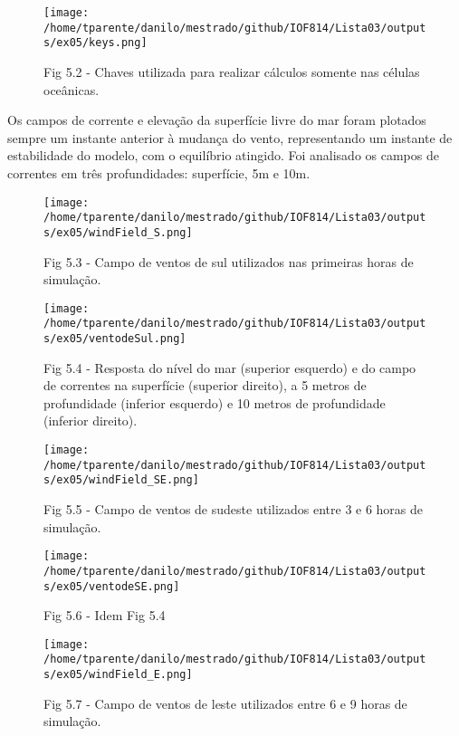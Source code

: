 \documentclass[11pt]{article}
\makeatletter
\def\maxwidth{\ifdim\Gin@nat@width>\linewidth\linewidth
    \else\Gin@nat@width\fi}
\let\Oldincludegraphics\includegraphics
\renewcommand{\includegraphics}[1]{\Oldincludegraphics[width=.8\maxwidth]{#1}}
\makeatother
\begin{document}
\begin{figure}[!ht]
\centering
\centerline{\hbox{\texttt{[image: /home/tparente/danilo/mestrado/github/IOF814/Lista03/outputs/ex05/keys.png]}}}
\caption{Fig 5.2 - Chaves utilizada para realizar cálculos somente nas células oceânicas.}
\label{fig5:2}
\end{figure}

Os campos de corrente e elevação da superfície livre do mar foram
plotados sempre um instante anterior à mudança do vento, representando
um instante de estabilidade do modelo, com o equilíbrio atingido. Foi
analisado os campos de correntes em três profundidades: superfície, 5m e
10m.

\begin{figure}[!ht]
\centering
\centerline{\hbox{\texttt{[image: /home/tparente/danilo/mestrado/github/IOF814/Lista03/outputs/ex05/windField\_S.png]}}}
\caption{Fig 5.3 - Campo de ventos de sul utilizados nas primeiras horas de simulação.}
\label{fig5:3}
\end{figure}

\begin{figure}[!ht]
\centering
\centerline{\hbox{\texttt{[image: /home/tparente/danilo/mestrado/github/IOF814/Lista03/outputs/ex05/ventodeSul.png]}}}
\caption{Fig 5.4 - Resposta do nível do mar (superior esquerdo) e do campo de correntes na superfície (superior direito), a 5 metros de profundidade (inferior esquerdo) e
10 metros de profundidade (inferior direito).}
\label{fig5:4}
\end{figure}

\begin{figure}[!ht]
\centering
\centerline{\hbox{\texttt{[image: /home/tparente/danilo/mestrado/github/IOF814/Lista03/outputs/ex05/windField\_SE.png]}}}
\caption{Fig 5.5 - Campo de ventos de sudeste utilizados entre 3 e 6 horas de simulação.}
\label{fig5:5}
\end{figure}

\begin{figure}[!ht]
\centering
\centerline{\hbox{\texttt{[image: /home/tparente/danilo/mestrado/github/IOF814/Lista03/outputs/ex05/ventodeSE.png]}}}
\caption{Fig 5.6 - Idem Fig 5.4}
\label{fig5:6}
\end{figure}

\begin{figure}[!ht]
\centering
\centerline{\hbox{\texttt{[image: /home/tparente/danilo/mestrado/github/IOF814/Lista03/outputs/ex05/windField\_E.png]}}}
\caption{Fig 5.7 - Campo de ventos de leste utilizados entre 6 e 9 horas de simulação.}
\label{fig5:7}
\end{figure}
\end{document}
